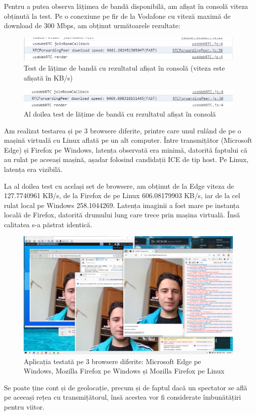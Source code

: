 \indent \par Pentru a putea observa lățimea de bandă disponibilă, am afișat în consolă viteza obținută la test. Pe o conexiune pe fir de la Vodafone cu viteză maximă de download de 300 Mbps, am obținut următoarele rezultate:
\begin{figure}[H]
    \centering
    \includegraphics[width=12cm]{figures/app_bandwidth_test.png}
    \caption{Test de lățime de bandă cu rezultatul afișat în consolă (viteza este afișată în KB/s)}
\end{figure}
\begin{figure}[H]
    \centering
    \includegraphics[width=12cm]{figures/app_bandwidth_test_2.png}
    \caption{Al doilea test de lățime de bandă cu rezultatul afișat în consolă}
\end{figure}
\indent \par Am realizat testarea și pe 3 browsere diferite, printre care unul rulând de pe o mașină virtuală cu Linux aflată pe un alt computer. Între transmițător (Microsoft Edge) și Firefox pe Windows, latența observată era minimă, datorită faptului că au rulat pe aceeași mașină, așadar folosind candidații ICE de tip host. Pe Linux, latența era vizibilă.
\indent \par La al doilea test cu același set de browsere, am obținut de la Edge viteza de 127.7740961 KB/s, de la Firefox de pe Linux 606.08179903 KB/s, iar de la cel rulat local pe Windows 258.1044269. Latența imaginii a fost mare pe instanța locală de Firefox, datorită drumului lung care trece prin mașina virtuală. Însă calitatea s-a păstrat identică.
\begin{figure}[H]
    \centering
    \includegraphics[width=12cm]{figures/app_on_3_browsers.png}
    \caption{Aplicația testată pe 3 browsere diferite: Microsoft Edge pe Windows, Mozilla Firefox pe Windows și Mozilla Firefox pe Linux}
\end{figure}
\indent \par Se poate ține cont și de geolocație, precum și de faptul dacă un spectator se află pe aceeași rețea cu transmițătorul, însă acestea vor fi considerate îmbunătățiri pentru viitor.